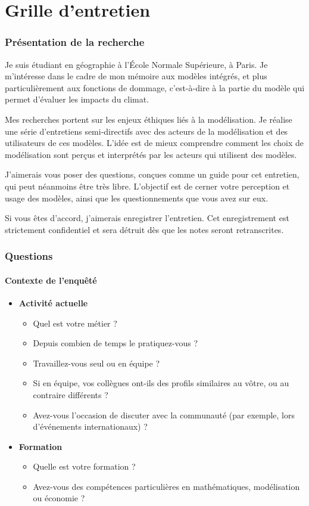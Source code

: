 \chapter{Grille d'entretien}
\label{ch:grille}


\subsection*{Présentation de la recherche}
Je suis étudiant en géographie à l'École Normale Supérieure, à Paris. Je m'intéresse dans le cadre de mon mémoire aux modèles intégrés, et plus particulièrement aux fonctions de dommage, c'est-à-dire à la partie du modèle qui permet d'évaluer les impacts du climat.

Mes recherches portent sur les enjeux éthiques liés à la modélisation. Je réalise une série d'entretiens semi-directifs avec des acteurs de la modélisation et des utilisateurs de ces modèles. L'idée est de mieux comprendre comment les choix de modélisation sont perçus et interprétés par les acteurs qui utilisent des modèles.

J'aimerais vous poser des questions, conçues comme un guide pour cet entretien, qui peut néanmoins être très libre. L'objectif est de cerner votre perception et usage des modèles, ainsi que les questionnements que vous avez sur eux.

Si vous êtes d'accord, j'aimerais enregistrer l'entretien. Cet enregistrement est strictement confidentiel et sera détruit dès que les notes seront retranscrites.

\subsection*{Questions}
\subsubsection*{Contexte de l'enquêté}
\begin{itemize}
    \item \textbf{Activité actuelle}
    \begin{itemize}
        \item Quel est votre métier ?
        \item Depuis combien de temps le pratiquez-vous ?
        \item Travaillez-vous seul ou en équipe ?
        \item Si en équipe, vos collègues ont-ils des profils similaires au vôtre, ou au contraire différents ?
        \item Avez-vous l'occasion de discuter avec la communauté (par exemple, lors d'événements internationaux) ?
    \end{itemize}
    \item \textbf{Formation}
    \begin{itemize}
        \item Quelle est votre formation ?
        \item Avez-vous des compétences particulières en mathématiques, modélisation ou économie ?
    \end{itemize}
\end{itemize}

